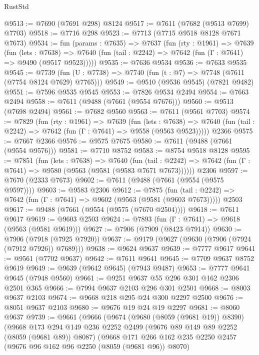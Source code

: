 \begin{lexlean}{RustStd}
\begin{coremodule}
{\begin{coremodule}
{{{{{{{{{{{{{{{{{{{{{{{{{{{{{{{{{{@9513 := @7690 (@7691 @298) @8124
@9517 := @7611 (@7682 (@9513 @7699) @7703)
@9518 := @7716 @298
@9523 := @7713 (@7715 @9518 @8128 @7671 @7673)
@9534 := fun (params : @7635) =>
  @7637
    (fun (rty : @1961) =>
    @7639
      (fun (lets : @7638) =>
      @7640 (fun (tail : @2242) => @7642 (fun (Γ : @7641) => @9490 (@9517 @9523)))))
@9535 := @7636 @9534
@9536 := @7633 @9535
@9545 := @7739 (fun (U : @7738) => @7740 (fun (t : @7) => @7748 (@7611 (@7754 @8124 @7629) @7765)))
@9549 := @9510 (@9536 @9545) (@7821 @9482)
@9551 := @7596 @9535 @9545
@9553 := @7826 @9534 @2494
@9554 := @7663 @2494
@9558 := @7611 (@9488 (@7661 (@9554 @7676)))
@9560 := @9513 (@7698 @2494)
@9561 := @7682 @9560
@9563 := @7611 (@9561 @7703)
@9574 := @7829
    (fun (rty : @1961) =>
    @7639
      (fun (lets : @7638) =>
      @7640 (fun (tail : @2242) => @7642 (fun (Γ : @7641) => @9558 (@9563 @9523)))))
    @2366
@9575 := @7667 @2366
@9576 := @9575 @7675
@9580 := @7611 (@9488 (@7661 (@9554 @9576)))
@9581 := @7710 @8752
@9583 := @8754 @9518 @8128
@9595 := @7851
    (fun (lets : @7638) =>
    @7640
      (fun (tail : @2242) => @7642 (fun (Γ : @7641) => @9580 (@9563 (@9581 (@9583 @7671 @7673))))))
    @2306
@9597 := @7670 (@2333 @7673)
@9602 := @7611 (@9488 (@7661 (@9554 (@9575 @9597))))
@9603 := @9583 @2306
@9612 := @7875
    (fun (tail : @2242) => @7642 (fun (Γ : @7641) => @9602 (@9563 (@9581 (@9603 @7673)))))
    @2503
@9617 := @9488 (@7661 (@9554 (@9575 (@7670 @2504))))
@9618 := @7611 @9617
@9619 := @9603 @2503
@9624 := @7893 (fun (Γ : @7641) => @9618 (@9563 (@9581 @9619)))
@9627 := @7906 (@7909 (@8423 @7914))
@9630 := @7906 (@7918 (@7925 @7920))
@9637 := @9179 (@9627 (@9630 (@7906 (@7924 (@7912 @7926)) @7689)))
@9638 := @9624 @9637
@9639 := @7777 @9617
@9641 := @9561 (@7702 @9637)
@9642 := @7611 @9641
@9645 := @7709 @9637 @8752 @9619
@9649 := @9639 (@9642 @9645) (@7943 @9487)
@9653 := @7777 @9641 @9645 (@7948 @9560)
@9661 := @9251 @9637 @55 @296 @301 @162 @2306 @2501 @365
@9666 := @7994 @9637 @2103 @296 @301 @2501
@9668 := @8003 @9637 @2103
@9674 := @9668 @218 @295 @24 @300 @2297 @2500
@9676 := @8051 @9637 @2103
@9680 := @9676 @19 @24 @19 @2297
@9681 := @8060 @9637
@9739 := @9661
    (@9666
      (@9674
        (@9680 (@8059 (@9681 @19)) @8390)
        (@9668
          @173
          @294
          @149
          @236
          @2252
          @2499
          (@9676 @89 @149 @89 @2252 (@8059 (@9681 @89)) @8087)
          (@9668
            @171
            @266
            @162
            @235
            @2250
            @2457
            (@9676 @96 @162 @96 @2250 (@8059 (@9681 @96)) @8070)
}}}}}}}}}}}}}}}}}}}}}}}}}}}}}}}}}}
\end{coremodule}}
\end{coremodule}
\end{lexlean}
